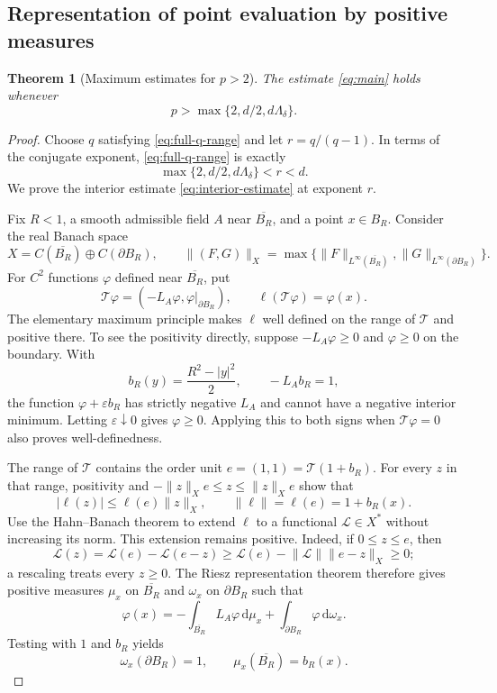 \documentclass[11pt,a4paper,reqno]{amsart}
\theoremstyle{plain}
\newtheorem{theorem}{Theorem}[section]
\theoremstyle{remark}
\numberwithin{equation}{section}
\newcommand{\lam}{\Lambda_\delta}
\newcommand{\dd}{\,\mathrm d}
\newcommand{\norm}[1]{\lVert#1\rVert}
\begin{document}
\subsection{Representation of point evaluation by positive measures}
\begin{theorem}[Maximum estimates for $p>2$]\label{thm:above-two}
The estimate \eqref{eq:main} holds whenever
\begin{equation}\label{eq:p-above-two}
 p>\max\{2,d/2,d\lam\}.
\end{equation}
\end{theorem}
\begin{proof}
Choose $q$ satisfying \eqref{eq:full-q-range} and let $r=q/(q-1)$. In terms of the conjugate exponent, \eqref{eq:full-q-range} is exactly
\begin{equation}\label{eq:r-range}
 \max\{2,d/2,d\lam\}<r<d.
\end{equation}
We prove the interior estimate \eqref{eq:interior-estimate} at exponent $r$.

Fix $R<1$, a smooth admissible field $A$ near $\overline{B_R}$, and a point $x\in B_R$. Consider the real Banach space
\[
 X=C(\overline{B_R})\oplus C(\partial B_R),\qquad
 \norm{(F,G)}_X=\max\{\norm F_{L^\infty(\overline{B_R})},
                         \norm G_{L^\infty(\partial B_R)}\}.
\]
For $C^2$ functions $\varphi$ defined near $\overline{B_R}$, put
\[
 \mathcal T\varphi=(-L_A\varphi,\varphi|_{\partial B_R}),
 \qquad \ell(\mathcal T\varphi)=\varphi(x).
\]
The elementary maximum principle makes $\ell$ well defined on the range of $\mathcal T$ and positive there. To see the positivity directly, suppose $-L_A\varphi\ge0$ and $\varphi\ge0$ on the boundary. With
\[
 b_R(y)=\frac{R^2-|y|^2}{2},\qquad -L_Ab_R=1,
\]
the function $\varphi+\varepsilon b_R$ has strictly negative $L_A$ and cannot have a negative interior minimum. Letting $\varepsilon\downarrow0$ gives $\varphi\ge0$. Applying this to both signs when $\mathcal T\varphi=0$ also proves well-definedness.

The range of $\mathcal T$ contains the order unit $e=(1,1)=\mathcal T(1+b_R)$. For every $z$ in that range, positivity and $-\norm z_Xe\le z\le\norm z_Xe$ show that
\[
 |\ell(z)|\le\ell(e)\norm z_X,
 \qquad \norm\ell=\ell(e)=1+b_R(x).
\]
Use the Hahn--Banach theorem to extend $\ell$ to a functional $\mathcal L\in X^*$ without increasing its norm. This extension remains positive. Indeed, if $0\le z\le e$, then
\[
 \mathcal L(z)=\mathcal L(e)-\mathcal L(e-z)
 \ge\mathcal L(e)-\norm{\mathcal L}\norm{e-z}_X\ge0;
\]
a rescaling treats every $z\ge0$. The Riesz representation theorem therefore gives positive measures $\mu_x$ on $\overline{B_R}$ and $\omega_x$ on $\partial B_R$ such that
\begin{equation}\label{eq:positive-representation}
 \varphi(x)=-\int_{\overline{B_R}}L_A\varphi\dd\mu_x
                  +\int_{\partial B_R}\varphi\dd\omega_x.
\end{equation}
Testing with $1$ and $b_R$ yields
\begin{equation}\label{eq:representation-masses}
 \omega_x(\partial B_R)=1,
 \qquad \mu_x(\overline{B_R})=b_R(x).
\end{equation}


\end{proof}
\end{document}
